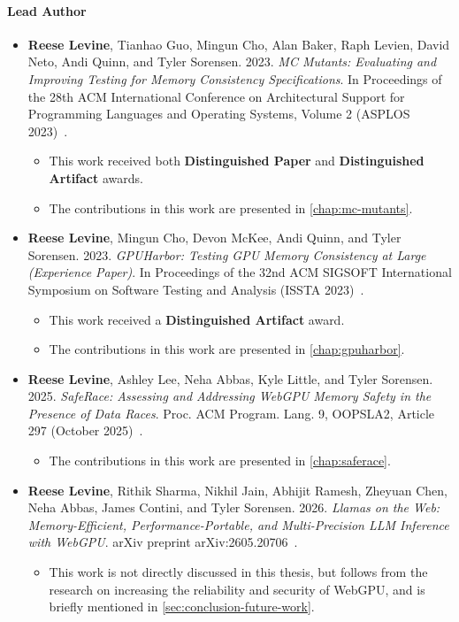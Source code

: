 \paragraph{Lead Author}
\begin{itemize}
  \item \textbf{Reese Levine}, Tianhao Guo, Mingun Cho, Alan Baker, Raph Levien, David Neto, Andi Quinn, and Tyler Sorensen. 2023. \textit{MC Mutants: Evaluating and Improving Testing for Memory Consistency Specifications}. In Proceedings of the 28th ACM International Conference on Architectural Support for Programming Languages and Operating Systems, Volume 2 (ASPLOS 2023)~\cite{levine2023mcmutants}.
  \begin{itemize}
    \item This work received both \textbf{Distinguished Paper} and \textbf{Distinguished Artifact} awards.
    \item The contributions in this work are presented in \mychaplong\ref{chap:mc-mutants}.
  \end{itemize}

  \item \textbf{Reese Levine}, Mingun Cho, Devon McKee, Andi Quinn, and Tyler Sorensen. 2023. \textit{GPUHarbor: Testing GPU Memory Consistency at Large (Experience Paper)}. In Proceedings of the 32nd ACM SIGSOFT International Symposium on Software Testing and Analysis (ISSTA 2023)~\cite{levine2023gpuharbor}.
  \begin{itemize}
    \item This work received a \textbf{Distinguished Artifact} award.
    \item The contributions in this work are presented in \mychaplong\ref{chap:gpuharbor}.
  \end{itemize}

  \item \textbf{Reese Levine}, Ashley Lee, Neha Abbas, Kyle Little, and Tyler Sorensen. 2025. \textit{SafeRace: Assessing and Addressing WebGPU Memory Safety in the Presence of Data Races}. Proc. ACM Program. Lang. 9, OOPSLA2, Article 297 (October 2025)~\cite{levine2025saferace}.
  \begin{itemize}
    \item The contributions in this work are presented in \mychaplong\ref{chap:saferace}.
  \end{itemize}

  \item \textbf{Reese Levine}, Rithik Sharma, Nikhil Jain, Abhijit Ramesh, Zheyuan Chen, Neha Abbas, James Contini, and Tyler Sorensen. 2026. \textit{Llamas on the Web: Memory-Efficient, Performance-Portable, and Multi-Precision LLM Inference with WebGPU}. arXiv preprint arXiv:2605.20706~\cite{levine2026llamaweb}.
  \begin{itemize}
    \item This work is not directly discussed in this thesis, but follows from the research on increasing the reliability and security of WebGPU, and is briefly mentioned in \mysec\ref{sec:conclusion-future-work}.
  \end{itemize}
\end{itemize}

